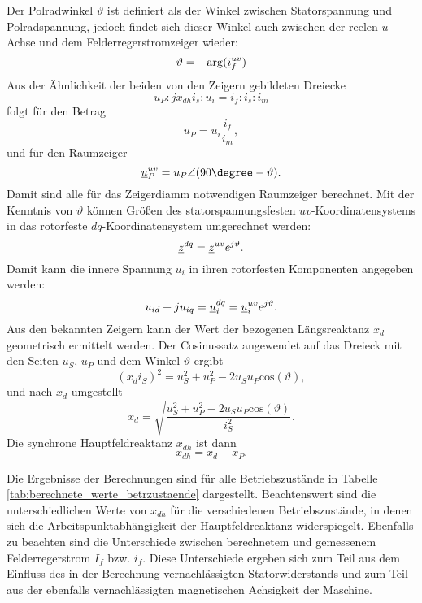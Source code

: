 \noindent Der Polradwinkel $\vartheta$ ist definiert als der Winkel zwischen Statorspannung und Polradspannung, jedoch findet sich dieser Winkel auch zwischen der reelen $u$-Achse und dem Felderregerstromzeiger wieder:
\begin{equation*}
    \vartheta=-\mathrm{arg}(\underline{i}^{uv}_f)
\end{equation*}
Aus der Ähnlichkeit der beiden von den Zeigern gebildeten Dreiecke
\begin{equation*}
    u_P : j x_{dh} i_s : u_i = i_f : i_s : i_m
\end{equation*}
folgt für den Betrag
\begin{equation*}
    u_P = u_i \frac{i_f}{i_m},
\end{equation*}
und für den Raumzeiger
\begin{equation*}
    \zuv{u}_P = u_P \angle (90\degree-\vartheta).
\end{equation*}
Damit sind alle für das Zeigerdiamm notwendigen Raumzeiger berechnet.
Mit der Kenntnis von $\vartheta$ können Größen des statorspannungsfesten $uv$-Koordinatensystems in das rotorfeste $dq$-Koordinatensystem umgerechnet werden:
\begin{equation*}
    \underline{z}^{dq} = \underline{z}^{uv} e^{j \vartheta}.
\end{equation*}
Damit kann die innere Spannung $u_i$ in ihren rotorfesten Komponenten angegeben werden:
\begin{equation*}
    u_{id}+j u_{iq} = \underline{u}^{dq}_i = \underline{u}^{uv}_i e^{j \vartheta}.
\end{equation*}
Aus den bekannten Zeigern kann der Wert der bezogenen Längsreaktanz $x_d$ geometrisch ermittelt werden. Der Cosinussatz angewendet auf das Dreieck mit den Seiten $u_S$, $u_P$ und dem Winkel $\vartheta$ ergibt
\begin{equation*}
    (x_d i_S)^2 = u_S^2 +u_P^2-2 u_S u_P \mathrm{cos}(\vartheta),
\end{equation*}
und nach $x_d$ umgestellt
\begin{equation*}
    x_d=\sqrt{\frac{u_S^2 +u_P^2-2 u_S u_P \mathrm{cos}(\vartheta)}{i_S^2}}.
\end{equation*}
Die synchrone Hauptfeldreaktanz $x_{dh}$ ist dann
\begin{equation*}
    x_{dh}=x_d-x_P.
\end{equation*}

\noindent Die Ergebnisse der Berechnungen sind für alle Betriebszustände in Tabelle \ref{tab:berechnete_werte_betrzustaende} dargestellt.
Beachtenswert sind die unterschiedlichen Werte von $x_{dh}$ für die verschiedenen Betriebszustände, in denen sich die Arbeitspunktabhängigkeit der Hauptfeldreaktanz widerspiegelt.
Ebenfalls zu beachten sind die Unterschiede zwischen berechnetem und gemessenem Felderregerstrom $I_f$ bzw. $i_f$. Diese Unterschiede ergeben sich zum Teil aus dem Einfluss des in der Berechnung vernachlässigten Statorwiderstands und zum Teil aus der ebenfalls vernachlässigten magnetischen Achsigkeit der Maschine. 

